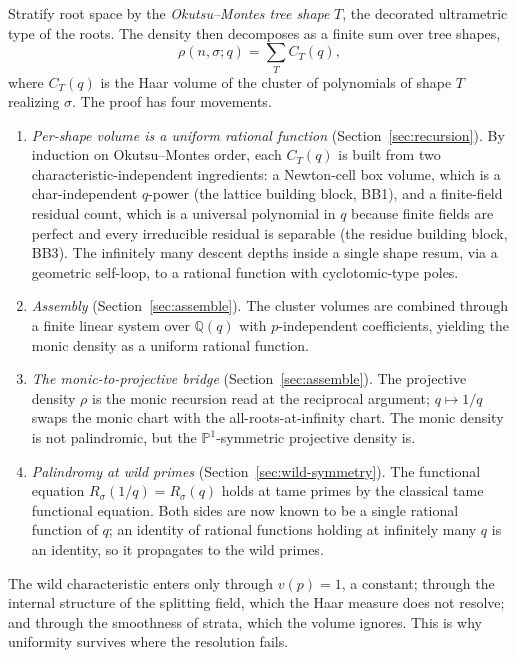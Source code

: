 \documentclass[pdflatex,sn-mathphys-num]{sn-jnl}%
\newcommand{\bbQ}{\mathbb{Q}}
\newcommand{\bbP}{\mathbb{P}}
\theoremstyle{plain}
\theoremstyle{definition}
\theoremstyle{remark}
\numberwithin{equation}{section}
\begin{document}
Stratify root space by the \emph{Okutsu--Montes tree shape} $T$, the decorated
ultrametric type of the roots. The density then decomposes as a finite sum over
tree shapes,
\begin{equation}\label{eq:tree-decomp}
  \rho(n,\sigma;q)=\sum_{T}C_{T}(q),
\end{equation}
where $C_{T}(q)$ is the Haar volume of the cluster of polynomials of shape $T$
realizing $\sigma$. The proof has four movements.
\begin{enumerate}[label=(\roman*),leftmargin=2.2em]
\item \emph{Per-shape volume is a uniform rational function} (Section~\ref{sec:recursion}).
By induction on Okutsu--Montes order, each $C_{T}(q)$ is built from two
characteristic-independent ingredients: a Newton-cell box volume, which is a
char-independent $q$-power (the lattice building block, \textsc{BB1}), and a
finite-field residual count, which is a universal polynomial in $q$ because finite
fields are perfect and every irreducible residual is separable (the residue
building block, \textsc{BB3}). The infinitely many descent depths inside a single
shape resum, via a geometric self-loop, to a rational function with
cyclotomic-type poles.
\item \emph{Assembly} (Section~\ref{sec:assemble}). The cluster volumes are
combined through a finite linear system over $\bbQ(q)$ with $p$-independent
coefficients, yielding the monic density as a uniform rational function.
\item \emph{The monic-to-projective bridge} (Section~\ref{sec:assemble}). The
projective density $\rho$ is the monic recursion read at the reciprocal argument;
$q\mapsto 1/q$ swaps the monic chart with the all-roots-at-infinity chart. The
monic density is not palindromic, but the $\bbP^{1}$-symmetric projective density
is.
\item \emph{Palindromy at wild primes} (Section~\ref{sec:wild-symmetry}). The
functional equation $R_{\sigma}(1/q)=R_{\sigma}(q)$ holds at tame primes by the
classical tame functional equation. Both sides are now known to be a single
rational function of $q$; an identity of rational functions holding at infinitely
many $q$ is an identity, so it propagates to the wild primes.
\end{enumerate}
The wild characteristic enters only through $v(p)=1$, a constant; through the
internal structure of the splitting field, which the Haar measure does not
resolve; and through the smoothness of strata, which the volume ignores. This is
why uniformity survives where the resolution fails.
\end{document}

